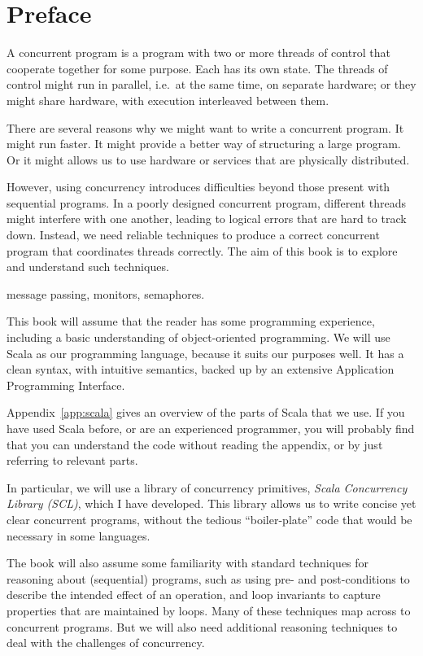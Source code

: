 \chapter*{Preface}

A concurrent program is a program with two or more threads of control that
cooperate together for some purpose.  Each has its own state.  The threads of
control might run in parallel, i.e.~at the same time, on separate hardware; or
they might share hardware, with execution interleaved between them.

There are several reasons why we might want to write a concurrent program.  It
might run faster.  It might provide a better way of structuring a large
program.  Or it might allows us to use hardware or services that are
physically distributed.

However, using concurrency introduces difficulties beyond those present with
sequential programs.  In a poorly designed concurrent program, different
threads might interfere with one another, leading to logical errors that are
hard to track down.  Instead, we need reliable techniques to produce a correct
concurrent program that coordinates threads correctly.  The aim
of this book is to explore and understand such techniques.

 message passing, monitors, semaphores. 

This book will assume that the reader has some programming experience,
including a basic understanding of object-oriented programming.  We will use
Scala as our programming language, because it suits our purposes well.  It has
a clean syntax, with intuitive semantics, backed up by an extensive
Application Programming Interface.

Appendix~\ref{app:scala} gives an overview of the parts of Scala that we use.
If you have used Scala before, or are an experienced programmer, you will
probably find that you can understand the code without reading the appendix,
or by just referring to relevant parts.  


In particular, we will use a library of concurrency primitives, \emph{Scala
  Concurrency Library (SCL)}, which I have developed.  This library allows us
to write concise yet clear concurrent programs, without the tedious
``boiler-plate'' code that would be necessary in some languages.

The book will also assume some familiarity with standard techniques for
reasoning about (sequential) programs, such as using pre- and post-conditions
to describe the intended effect of an operation, and loop invariants to
capture properties that are maintained by loops.  Many of these techniques map
across to concurrent programs.  But we will also need additional reasoning
techniques to deal with the challenges of concurrency.

